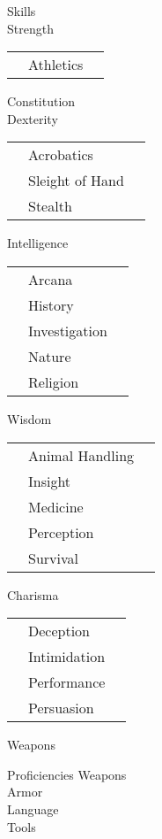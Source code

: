 \documentclass[a4paper,10pt,bg=print]{dndbook} %
\begin{document}
	\begin{minipage}[t]{.25\linewidth}\normalsize
		{\LARGE Skills}\\
		\textcolor{titlered}{\large Strength}\\
		\begin{tabularx}{\textwidth}{lXr}
			&Athletics&\\
		\end{tabularx}
		\textcolor{titlered}{\large Constitution}\\
		\textcolor{titlered}{\large Dexterity}\\
		\begin{tabularx}{\textwidth}{lXr}
			&Acrobatics&\\
			&Sleight of Hand&\\
			&Stealth&\\
		\end{tabularx}
		\textcolor{titlered}{\large Intelligence}\\
		\begin{tabularx}{\textwidth}{lXr}
			&Arcana&\\
			&History&\\
			&Investigation&\\
			&Nature&\\
			&Religion&\\
		\end{tabularx}
		\textcolor{titlered}{\large Wisdom}\\
		\begin{tabularx}{\textwidth}{lXr}
			&Animal Handling&\\
			&Insight&\\
			&Medicine&\\
			&Perception&\\
			&Survival&\\
		\end{tabularx}
		\textcolor{titlered}{\large Charisma}\\
		\begin{tabularx}{\textwidth}{lXr}
    		&Deception&\\
			&Intimidation&\\
			&Performance&\\
			&Persuasion&\\
		\end{tabularx}
		\textcolor{titlered}{\large Weapons}\linebreak
	\end{minipage}%
	\begin{minipage}[t]{.25\linewidth}\normalsize
		{\LARGE Proficiencies}
		\textcolor{titlered}{\large Weapons}\vspace*{4cm}\\
		\textcolor{titlered}{\large Armor}\vspace*{4cm}\\
		\textcolor{titlered}{\large Language}\vspace*{4cm}\\
		\textcolor{titlered}{\large Tools}
	\end{minipage}%
\end{document}
